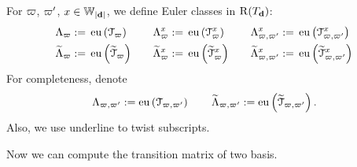 \begin{defn}
For $\varpi$, $\varpi'$, $x \in \mathbb{W}_{|\mathbf{d}|}$, we define Euler classes in $\operatorname{\operatorname{R}}(T_{\mathbf{d}})$:
\begin{equation*}
\begin{aligned}
  \Lambda_{\varpi}:=\;& \operatorname{\operatorname{eu}}\left(\mathcal{T}_{\varpi}\right) \quad& \Lambda_{\varpi}^x:=\;& \operatorname{\operatorname{eu}}\left(\mathcal{T}_{\varpi}^x\right) \quad& \Lambda_{\varpi,\varpi'}^x:=\;& \operatorname{\operatorname{eu}}\left(\mathcal{T}_{\varpi,\varpi'}^x \right) \\ 
    \widetilde{\Lambda}_{\varpi}:=\;& \operatorname{\operatorname{eu}}\left(\widetilde{\mathcal{T}}_{\varpi}\right) \quad& \widetilde{\Lambda}_{\varpi}^x:=\;& \operatorname{\operatorname{eu}}\left(\widetilde{\mathcal{T}}_{\varpi}^x\right) \quad& \widetilde{\Lambda}_{\varpi,\varpi'}^x:=\;& \operatorname{\operatorname{eu}}\left(\widetilde{\mathcal{T}}_{\varpi,\varpi'}^x\right)  \\ 
\end{aligned}
\end{equation*}
For completeness, denote
$$\Lambda_{\varpi,\varpi'}:=\operatorname{\operatorname{eu}}\left(\mathcal{T}_{\varpi,\varpi'}\right) \qquad \widetilde{\Lambda}_{\varpi,\varpi'}:=\operatorname{\operatorname{eu}}\left(\widetilde{\mathcal{T}}_{\varpi,\varpi'}\right).$$
Also, we use underline to twist subscripts.
\end{defn}

Now we can compute the transition matrix of two basis.

